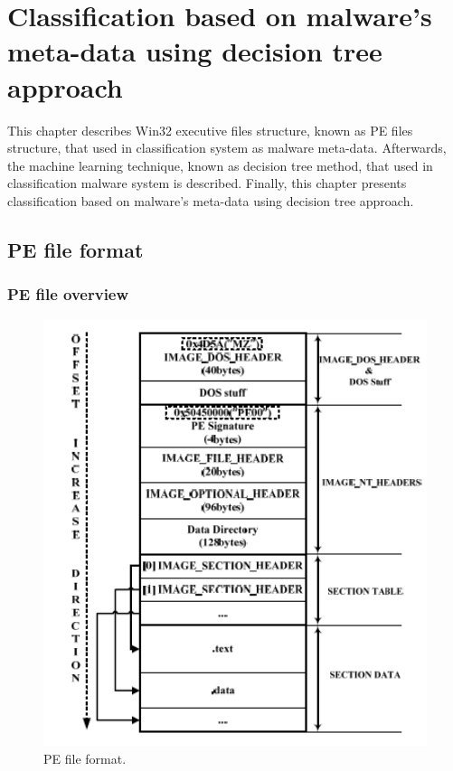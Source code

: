 \chapter{Classification based on malware's meta-data using decision tree approach}\label{chap:4}
%
%
This chapter describes Win32 executive files structure, known as PE files structure, that used in classification system as malware meta-data. Afterwards, the machine learning technique, known as decision tree method, that used in classification malware system is described. Finally, this chapter presents classification based on malware's meta-data using decision tree approach. 

\section{PE file format}
\subsection{PE file overview}
\begin{figure}[h!]
\centering
\includegraphics[width=1\textwidth]{graph/pe1.png}
\caption{PE file format.}
\label{fig:pe1}
\end{figure}

